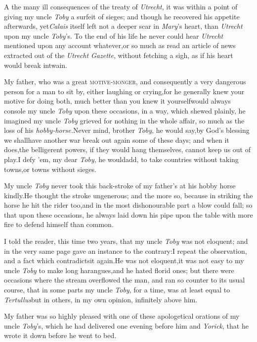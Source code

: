 \documentclass{article}
\begin{document}
\lettrine{A}{\!} the many ill consequences of
the treaty of \textit{Utrecht}, it was within a point of giving my
uncle \textit{Toby} a surfeit of sieges; and though he recovered his
appetite afterwards, yet\pb \textit{Calais} itself left not a deeper
scar in \textit{Mary}’s heart, than \textit{Utrecht} upon my
uncle \textit{Toby}’s. To the end of his life he never could hear \textit{Utrecht} mentioned upon any
account whatever,\tsk or so much as read an article of news
extracted out of the \textit{Utrecht Gazette}, without fetching a
sigh, as if his heart would break in\break twain.

My father, who was a great \textsc{motive-monger}, and
consequently a very dangerous person for a man to sit by, either
laughing or crying,\tsk for he generally knew your motive for
doing both, much better than you knew it yourself\tsk would
always console my uncle \textit{Toby} upon these occasions, in a way,
which shewed plainly, he imagined my uncle \textit{Toby} grieved for
nothing in the whole affair, so much as the loss of his
\textit{hobby-horse.}\tsh Never mind, brother \textit{Toby},
he would say,\tsk by God’s blessing we shall\pb have another
war break out again some of these days; and when it does,\tsk the
belligerent powers, if they would hang themselves, cannot keep us
out of play.\break\tsh I defy ’em, my dear \textit{Toby}, he
would\break add, to take countries without taking towns,\tsh or
towns without sieges.

My uncle \textit{Toby} never took this back-stroke of my
father’s at his hobby horse kindly.\tsh He thought
the stroke ungenerous; and the more so, because in striking the
horse he hit the rider too,\break and in the most dishonourable part a
blow could fall; so that upon these occasions, he always laid down
his pipe upon the table with more fire to defend himself than
common.

I told the reader, this time two years, that my uncle
\textit{Toby} was not eloquent; and in the very same page gave an
instance to the contrary:\tsh I repeat the observation,
and a fact which contradicts\pb it again.\tsk He was not
eloquent,\tsk it was not easy to my uncle \textit{Toby} to make
long harangues,\tsk and he hated florid ones;\break
but there were occasions where the stream overflowed the man, and ran so counter to
its usual course, that in some parts my uncle \textit{Toby}, for a time, was at
least equal to \textit{Tertullus}\tsh but in others, in my own opinion, infinitely
above him.

My father was so highly pleased with one of these apologetical
orations of my uncle \textit{Toby}’s, which he had delivered
one evening before him and \textit{Yorick}, that he wrote it down
before he went to bed.
\end{document}
